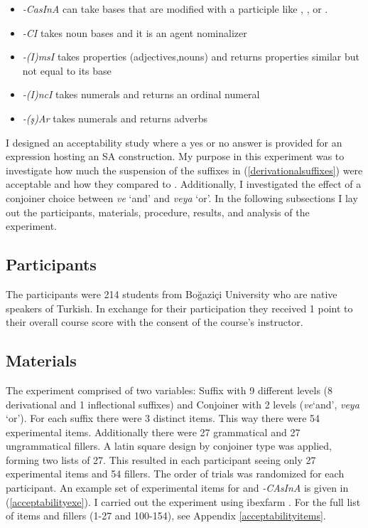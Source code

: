 \begin{exe}
\ex \label{suffixesdiffer}
\begin{itemize}
\item \textit{-CasInA} can take bases that are modified with a participle like {\Prf}, {\Prog}, or {\Aor}. 

\item \textit{-CI} takes noun bases and it is an agent nominalizer

\item \textit{-(I)msI} takes properties (adjectives,nouns) and returns properties similar but not equal to its base

\item \textit{-(I)ncI} takes numerals and returns an ordinal numeral

\item \textit{-(ş)Ar} takes numerals and returns adverbs

\end{itemize}
\end{exe}

I designed an acceptability study where a yes or no answer is provided for an expression hosting an SA construction. My purpose in this experiment was to investigate how much the suspension of the suffixes in (\ref{derivationalsuffixes}) were acceptable and how they compared to {\Acc}. Additionally, I investigated the effect of a conjoiner choice between \textit{ve} `and' and \textit{veya} `or'. In the following subsections I lay out the participants, materials, procedure, results, and analysis of the experiment.

\subsection{Participants}

The participants were 214 students from Boğaziçi University who are native speakers of Turkish. In exchange for their participation they received 1 point to their overall course score with the consent of the course's instructor.


\subsection{Materials}

The experiment comprised of two variables: Suffix with 9 different levels (8 derivational and 1 inflectional {\Acc} suffixes) and Conjoiner with 2 levels (\textit{ve}`and', \textit{veya} `or'). For each suffix there were 3 distinct items. This way there were 54 experimental items. Additionally there were 27 grammatical and 27 ungrammatical fillers. A latin square design by conjoiner type was applied, forming two lists of 27. This resulted in each participant seeing only 27 experimental items and 54 fillers. The order of trials was randomized for each participant. An example set of experimental items for {\Acc} and \textit{-CAsInA} is given in (\ref{acceptabilityexe}). I carried out the experiment using ibexfarm \citep{drummond2013ibex}. For the full list of items and fillers (1-27 and 100-154), see Appendix \ref{acceptabilityitems}.

